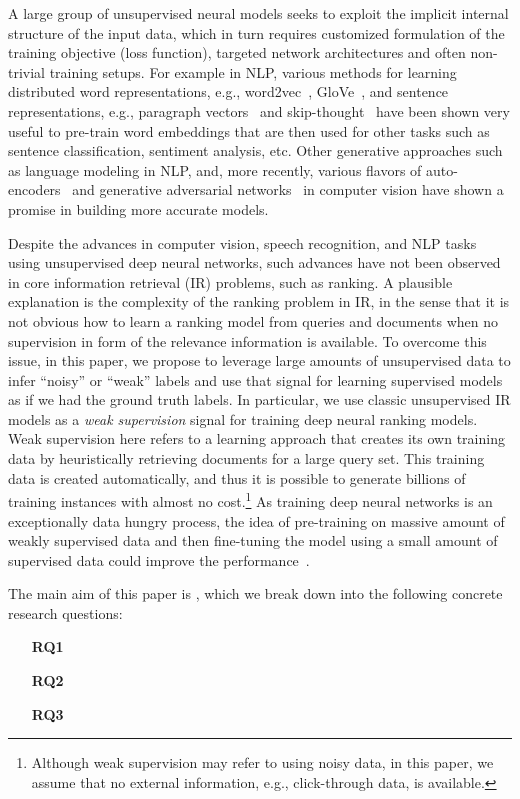 \documentclass[sigconf]{acmart}
\begin{document}
A large group of unsupervised neural models seeks to exploit the implicit internal structure of the input data, which in turn requires customized formulation of the training objective (loss function), targeted network architectures and often non-trivial training setups. 
For example in NLP, various methods for learning distributed word representations, e.g., word2vec~\citep{Mikolov:2013}, GloVe~\citep{Pennington:2014}, and sentence representations, e.g., paragraph vectors~\citep{Le:2014} and skip-thought~\citep{Kiros:2015} have been shown very useful to pre-train word embeddings that are then used for other tasks such as sentence classification, sentiment analysis, etc.
Other generative approaches such as language modeling in NLP, and, more recently, various flavors of auto-encoders~\citep{Baldi:2012} and generative adversarial networks~\citep{Goodfellow:2014} in computer vision have shown a promise in building more accurate models.

Despite the advances in computer vision, speech recognition, and NLP tasks using unsupervised deep neural networks, such advances have not been observed in core information retrieval (IR) problems, such as ranking. 
A plausible explanation is the complexity of the ranking problem in IR, in the sense that it is not obvious how to learn a ranking model from queries and documents when no supervision in form of the relevance information is available.
To overcome this issue, in this paper, we propose to leverage large amounts of unsupervised data to infer ``noisy'' or ``weak'' labels and use that signal for learning supervised models as if we had the ground truth labels. 
In particular, we use classic unsupervised IR models as a \emph{weak supervision} signal for training deep neural ranking models.
Weak supervision here refers to a learning approach that creates its own training data by heuristically retrieving documents for a large query set. 
This training data is created automatically, and thus it is possible to generate billions of training instances with almost no cost.\footnote{Although weak supervision may refer to using noisy data, in this paper, we assume that no external information, e.g., click-through data, is available.}
As training deep neural networks is an exceptionally data hungry process, the idea of pre-training on massive amount of weakly supervised data and then fine-tuning the model using a small amount of supervised data could improve the performance~\citep{Rrhan:2010}. 



The main aim of this paper is \textsl{\maingoal}, which we break down into the following concrete research questions:
\begin{enumerate}
  \setlength{\topsep}{0pt}
  \setlength{\partopsep}{0pt}
  \setlength{\itemsep}{0pt}
  \setlength{\parskip}{0pt}
  \setlength{\parsep}{0pt}
\item[\textbf{RQ1}] \textsl{\rqone}
\item[\textbf{RQ2}] \textsl{\rqtwo}
\item[\textbf{RQ3}] \textsl{\rqthree}
\end{enumerate}
\end{document}

